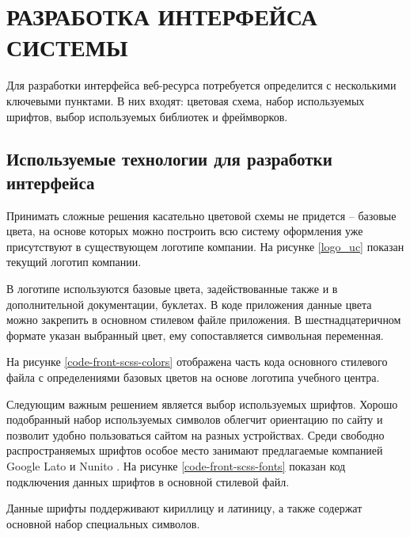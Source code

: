 \section{РАЗРАБОТКА ИНТЕРФЕЙСА СИСТЕМЫ}

Для разработки интерфейса веб-ресурса потребуется определится с несколькими ключевыми пунктами.
В них входят: цветовая схема, набор используемых шрифтов, выбор используемых библиотек и фреймворков.


\subsection{Используемые технологии для разработки интерфейса}

Принимать сложные решения касательно цветовой схемы не придется -- базовые цвета, на основе которых можно построить всю систему оформления уже присутствуют в существующем логотипе компании.
На рисунке \ref{logo_uc} показан текущий логотип компании.


В логотипе используются базовые цвета, задействованные также и в дополнительной документации, буклетах.
В коде приложения данные цвета можно закрепить в основном стилевом файле приложения.
В шестнадцатеричном формате указан выбранный цвет, ему сопоставляется символьная переменная.

На рисунке \ref{code-front-scss-colors} отображена часть кода основного стилевого файла с определениями базовых цветов на основе логотипа учебного центра.


Следующим важным решением является выбор используемых шрифтов.
Хорошо подобранный набор используемых символов облегчит ориентацию по сайту и позволит удобно пользоваться сайтом на разных устройствах.
Среди свободно распространяемых шрифтов особое место занимают предлагаемые компанией Google Lato \cite{google-lato} и Nunito \cite{google-nunito}.
На рисунке \ref{code-front-scss-fonts} показан код подключения данных шрифтов в основной стилевой файл.


Данные шрифты поддерживают кириллицу и латиницу, а также содержат основной набор специальных символов.

